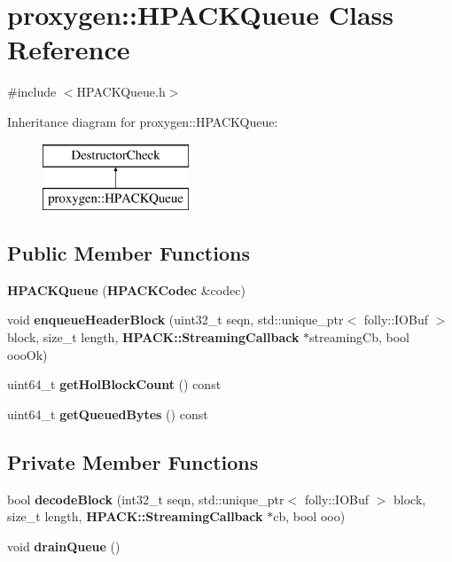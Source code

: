 \section{proxygen\+:\+:H\+P\+A\+C\+K\+Queue Class Reference}
\label{classproxygen_1_1HPACKQueue}


{\ttfamily \#include $<$H\+P\+A\+C\+K\+Queue.\+h$>$}

Inheritance diagram for proxygen\+:\+:H\+P\+A\+C\+K\+Queue\+:\begin{figure}[H]
\begin{center}
\leavevmode
\includegraphics[height=2.000000cm]{classproxygen_1_1HPACKQueue}
\end{center}
\end{figure}
\subsection*{Public Member Functions}
\begin{DoxyCompactItemize}
\item 
{\bf H\+P\+A\+C\+K\+Queue} ({\bf H\+P\+A\+C\+K\+Codec} \&codec)
\item 
void {\bf enqueue\+Header\+Block} (uint32\+\_\+t seqn, std\+::unique\+\_\+ptr$<$ folly\+::\+I\+O\+Buf $>$ block, size\+\_\+t length, {\bf H\+P\+A\+C\+K\+::\+Streaming\+Callback} $\ast$streaming\+Cb, bool ooo\+Ok)
\item 
uint64\+\_\+t {\bf get\+Hol\+Block\+Count} () const 
\item 
uint64\+\_\+t {\bf get\+Queued\+Bytes} () const 
\end{DoxyCompactItemize}
\subsection*{Private Member Functions}
\begin{DoxyCompactItemize}
\item 
bool {\bf decode\+Block} (int32\+\_\+t seqn, std\+::unique\+\_\+ptr$<$ folly\+::\+I\+O\+Buf $>$ block, size\+\_\+t length, {\bf H\+P\+A\+C\+K\+::\+Streaming\+Callback} $\ast$cb, bool ooo)
\item 
void {\bf drain\+Queue} ()
\end{DoxyCompactItemize}
